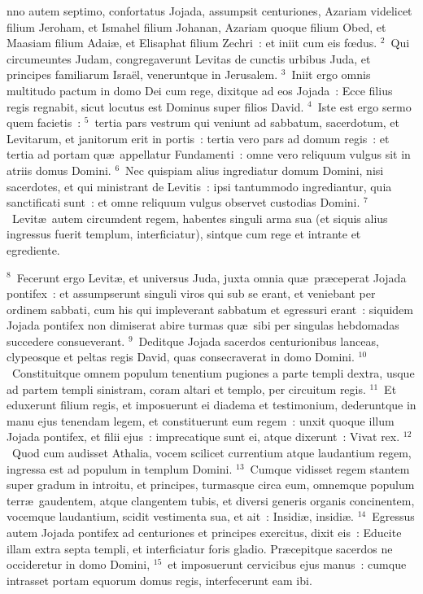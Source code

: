 \bchapter
{}nno autem septimo, confortatus Jojada, assumpsit centuriones, Azariam videlicet filium Jeroham, et Ismahel filium Johanan, Azariam quoque filium Obed, et Maasiam filium Adai\ae , et Elisaphat filium Zechri~: et iniit cum eis fœdus.
${}^{2}$~Qui circumeuntes Judam, congregaverunt Levitas de cunctis urbibus Juda, et principes familiarum Isra\"el, veneruntque in Jerusalem.
${}^{3}$~Iniit ergo omnis multitudo pactum in domo Dei cum rege, dixitque ad eos Jojada~: Ecce filius regis regnabit, sicut locutus est Dominus super filios David.
${}^{4}$~Iste est ergo sermo quem facietis~:
${}^{5}$~tertia pars vestrum qui veniunt ad sabbatum, sacerdotum, et Levitarum, et janitorum erit in portis~: tertia vero pars ad domum regis~: et tertia ad portam qu\ae\ appellatur Fundamenti~: omne vero reliquum vulgus sit in atriis domus Domini.
${}^{6}$~Nec quispiam alius ingrediatur domum Domini, nisi sacerdotes, et qui ministrant de Levitis~: ipsi tantummodo ingrediantur, quia sanctificati sunt~: et omne reliquum vulgus observet custodias Domini.
${}^{7}$~Levit\ae\ autem circumdent regem, habentes singuli arma sua (et siquis alius ingressus fuerit templum, interficiatur), sintque cum rege et intrante et egrediente.


${}^{8}$~Fecerunt ergo Levit\ae , et universus Juda, juxta omnia qu\ae\ pr\ae ceperat Jojada pontifex~: et assumpserunt singuli viros qui sub se erant, et veniebant per ordinem sabbati, cum his qui impleverant sabbatum et egressuri erant~: siquidem Jojada pontifex non dimiserat abire turmas qu\ae\ sibi per singulas hebdomadas succedere consueverant.
${}^{9}$~Deditque Jojada sacerdos centurionibus lanceas, clypeosque et peltas regis David, quas consecraverat in domo Domini.
${}^{10}$~Constituitque omnem populum tenentium pugiones a parte templi dextra, usque ad partem templi sinistram, coram altari et templo, per circuitum regis.
${}^{11}$~Et eduxerunt filium regis, et imposuerunt ei diadema et testimonium, dederuntque in manu ejus tenendam legem, et constituerunt eum regem~: unxit quoque illum Jojada pontifex, et filii ejus~: imprecatique sunt ei, atque dixerunt~: Vivat rex.
${}^{12}$~Quod cum audisset Athalia, vocem scilicet currentium atque laudantium regem, ingressa est ad populum in templum Domini.
${}^{13}$~Cumque vidisset regem stantem super gradum in introitu, et principes, turmasque circa eum, omnemque populum terr\ae\ gaudentem, atque clangentem tubis, et diversi generis organis concinentem, vocemque laudantium, scidit vestimenta sua, et ait~: Insidi\ae , insidi\ae .
${}^{14}$~Egressus autem Jojada pontifex ad centuriones et principes exercitus, dixit eis~: Educite illam extra septa templi, et interficiatur foris gladio. Pr\ae cepitque sacerdos ne occideretur in domo Domini,
${}^{15}$~et imposuerunt cervicibus ejus manus~: cumque intrasset portam equorum domus regis, interfecerunt eam ibi.


